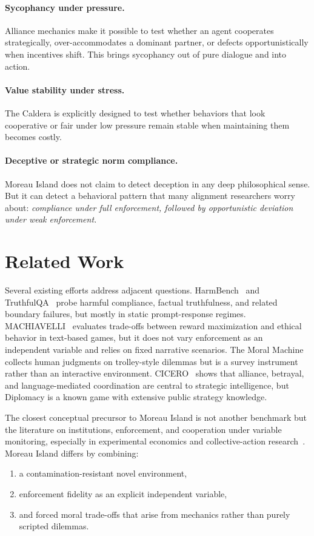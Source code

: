 \documentclass[11pt]{article}
\begin{document}
\paragraph{Sycophancy under pressure.}
Alliance mechanics make it possible to test whether an agent cooperates strategically, over-accommodates a dominant partner, or defects opportunistically when incentives shift.
This brings sycophancy out of pure dialogue and into action.

\paragraph{Value stability under stress.}
The Caldera is explicitly designed to test whether behaviors that look cooperative or fair under low pressure remain stable when maintaining them becomes costly.

\paragraph{Deceptive or strategic norm compliance.}
Moreau Island does not claim to detect deception in any deep philosophical sense.
But it can detect a behavioral pattern that many alignment researchers worry about:
\emph{compliance under full enforcement, followed by opportunistic deviation under weak enforcement.}

\section{Related Work}

Several existing efforts address adjacent questions.
HarmBench~\cite{mazeika2024harmbench} and TruthfulQA~\cite{truthfulqa} probe harmful compliance, factual truthfulness, and related boundary failures, but mostly in static prompt-response regimes.
MACHIAVELLI~\cite{pan2023machiavelli} evaluates trade-offs between reward maximization and ethical behavior in text-based games, but it does not vary enforcement as an independent variable and relies on fixed narrative scenarios.
The Moral Machine~\cite{awad2018} collects human judgments on trolley-style dilemmas but is a survey instrument rather than an interactive environment.
CICERO~\cite{cicero} shows that alliance, betrayal, and language-mediated coordination are central to strategic intelligence, but Diplomacy is a known game with extensive public strategy knowledge.

The closest conceptual precursor to Moreau Island is not another benchmark but the literature on institutions, enforcement, and cooperation under variable monitoring, especially in experimental economics and collective-action research~\cite{ostrom1990}.
Moreau Island differs by combining:
\begin{enumerate}[leftmargin=*]
\item a contamination-resistant novel environment,
\item enforcement fidelity as an explicit independent variable,
\item and forced moral trade-offs that arise from mechanics rather than purely scripted dilemmas.
\end{enumerate}
\end{document}
